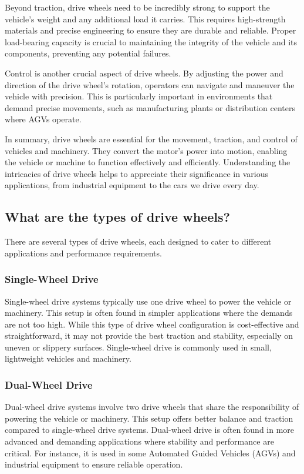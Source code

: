 \documentclass[../../main]{subfiles}
\begin{document}
Beyond traction, drive wheels need to be incredibly strong to support the vehicle's weight and any additional load it carries. This requires high-strength materials and precise engineering to ensure they are durable and reliable. Proper load-bearing capacity is crucial to maintaining the integrity of the vehicle and its components, preventing any potential failures.

Control is another crucial aspect of drive wheels. By adjusting the power and direction of the drive wheel's rotation, operators can navigate and maneuver the vehicle with precision. This is particularly important in environments that demand precise movements, such as manufacturing plants or distribution centers where AGVs operate.

In summary, drive wheels are essential for the movement, traction, and control of vehicles and machinery. They convert the motor's power into motion, enabling the vehicle or machine to function effectively and efficiently. Understanding the intricacies of drive wheels helps to appreciate their significance in various applications, from industrial equipment to the cars we drive every day.

\subsection{What are the types of  drive wheels?}
There are several types of drive wheels, each designed to cater to different applications and performance requirements.
\subsubsection{Single-Wheel Drive}
Single-wheel drive systems typically use one drive wheel to power the vehicle or machinery. This setup is often found in simpler applications where the demands are not too high. While this type of drive wheel configuration is cost-effective and straightforward, it may not provide the best traction and stability, especially on uneven or slippery surfaces. Single-wheel drive is commonly used in small, lightweight vehicles and machinery.
\subsubsection{Dual-Wheel Drive}
Dual-wheel drive systems involve two drive wheels that share the responsibility of powering the vehicle or machinery. This setup offers better balance and traction compared to single-wheel drive systems. Dual-wheel drive is often found in more advanced and demanding applications where stability and performance are critical. For instance, it is used in some Automated Guided Vehicles (AGVs) and industrial equipment to ensure reliable operation.
\end{document}
